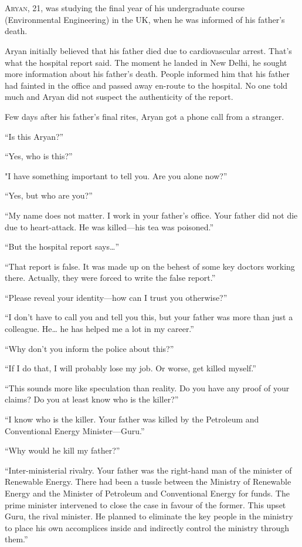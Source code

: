 \chapter{}

\lettrine{A}{ryan}, 21, was studying the final year of his undergraduate course
(Environmental Engineering) in the UK, when he was informed of his father's
death.

Aryan initially believed that his father died due to cardiovascular arrest.
That's what the hospital report said. The moment he landed in New Delhi, he
sought more information about his father's death. People informed him that his
father had fainted in the office and passed away en-route to the hospital. No
one told much and Aryan did not suspect the authenticity of the report.

Few days after his father's final rites, Aryan got a phone call from a stranger.

“Is this Aryan?”

“Yes, who is this?”

"I have something important to tell you. Are you alone now?”

“Yes, but who are you?”

“My name does not matter. I work in your father's office. Your father did not
die due to heart-attack. He was killed—his tea was poisoned.”

“But the hospital report says…”

“That report is false. It was made up on the behest of some key doctors working
there. Actually, they were forced to write the false report.”

“Please reveal your identity—how can I trust you otherwise?”

“I don't have to call you and tell you this, but your father was more than just
a colleague. He… he has helped me a lot in my career.”

“Why don't you inform the police about this?”

“If I do that, I will probably lose my job. Or worse, get killed myself.”

“This sounds more like speculation than reality. Do you have any proof of your
claims? Do you at least know who is the killer?”

“I know who is the killer. Your father was killed by the Petroleum and
Conventional Energy Minister—Guru.”

“Why would he kill my father?”

“Inter-ministerial rivalry. Your father was the right-hand man of the minister
of Renewable Energy. There had been a tussle between the Ministry of Renewable Energy
and the Minister of Petroleum and Conventional Energy for funds. The prime minister
intervened to close the case in favour of the former. This
upset Guru, the rival minister. He planned to eliminate the key people in the
ministry to place his own accomplices inside and indirectly
control the ministry through them.”

